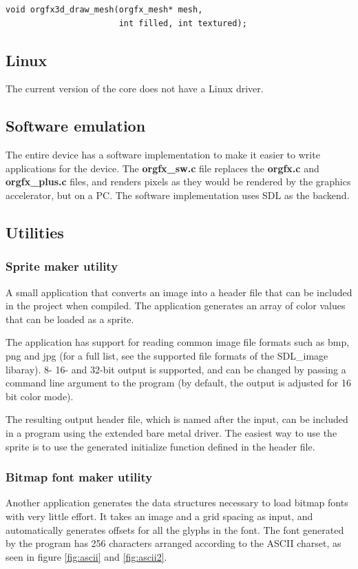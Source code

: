 \documentclass[10pt,a4paper]{article}
\begin{document}
\begin{lstlisting}
void orgfx3d_draw_mesh(orgfx_mesh* mesh,
                       int filled, int textured);
\end{lstlisting}

\subsection{Linux}
The current version of the core does not have a Linux driver.

\subsection{Software emulation}
The entire device has a software implementation to make it easier to write applications for the device. The \textbf{orgfx\_sw.c} file replaces the \textbf{orgfx.c} and \textbf{orgfx\_plus.c} files, and renders pixels as they would be rendered by the graphics accelerator, but on a PC. The software implementation uses SDL as the backend.

\subsection{Utilities}
\subsubsection{Sprite maker utility}
\label{sec:spritemaker}
A small application that converts an image into a header file that can be included in the project when compiled. The application generates an array of color values that can be loaded as a sprite.

The application has support for reading common image file formats such as bmp, png and jpg (for a full list, see the supported file formats of the SDL\_image libaray). 8- 16- and 32-bit output is supported, and can be changed by passing a command line argument to the program (by default, the output is adjusted for 16 bit color mode).

The resulting output header file, which is named after the input, can be included in a program using the extended bare metal driver. The easiest way to use the sprite is to use the generated initialize function defined in the header file.

\subsubsection{Bitmap font maker utility}
\label{sec:bitmapfontmaker}
Another application generates the data structures necessary to load bitmap fonts with very little effort. It takes an image and a grid spacing as input, and automatically generates offsets for all the glyphs in the font. The font generated by the program has 256 characters arranged according to the ASCII charset, as seen in figure \ref{fig:ascii} and \ref{fig:ascii2}.
\end{document}
